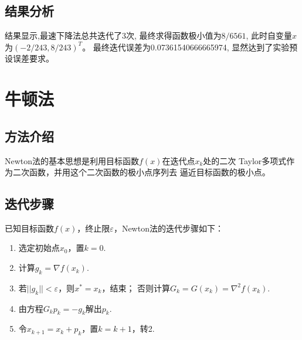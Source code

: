 \documentclass[12pt,a4paper]{article}
\begin{document}
    ~\\~\\~\\~\\~\\~\\~\\~\\~\\~\\
    \subsection{结果分析}

    结果显示,最速下降法总共迭代了3次,
    最终求得函数极小值为$8/6561$,
    此时自变量$x$为$(-2/243,8/243)^T$。
    最终迭代误差为0.07361540666665974,
    显然达到了实验预设误差要求。

\section{牛顿法}
\subsection{方法介绍}
Newton法的基本思想是利用目标函数$f(x)$在迭代点$x_k$处的二次
Taylor多项式作为二次函数，并用这个二次函数的极小点序列去
逼近目标函数的极小点。
\subsection{迭代步骤}
已知目标函数$f(x)$，终止限$\varepsilon$，Newton法的迭代步骤如下：
\begin{enumerate}
    \item 选定初始点$x_0$，置$k=0$.
    \item 计算$g_k=\nabla f(x_k)$.
    \item 若$||g_k||<\varepsilon$，则$x^*=x_k$，结束；
    否则计算$G_k=G(x_k)=\nabla ^2f(x_k)$.
    \item 由方程$G_kp_k=-g_k$解出$p_k$.
    \item 令$x_{k+1}=x_k+p_k$，置$k=k+1$，转2.
\end{enumerate}
\end{document}
